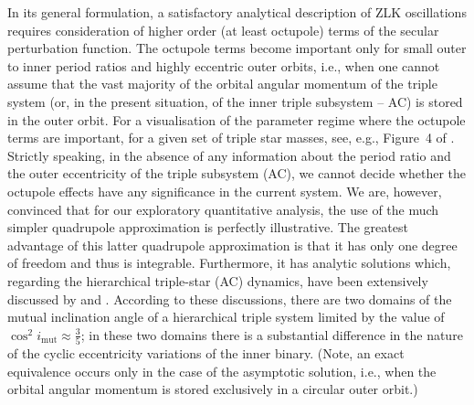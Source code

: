 \documentclass[fleqn,usenatbib]{mnras} %
\begin{document}
In its general formulation, a satisfactory analytical description of ZLK oscillations requires consideration of higher order (at least octupole) terms of the secular perturbation function. The octupole terms become important only for small outer to inner period ratios and highly eccentric outer orbits, i.e., when one cannot assume that the vast majority of the orbital angular momentum of the triple system (or, in the present situation, of the inner triple subsystem -- AC) is stored in the outer orbit. For a visualisation of the parameter regime where the octupole terms are important, for a given set of triple star masses, see, e.g., Figure~4 of \citet{Toonen2020}. Strictly speaking, in the absence of any information about the period ratio and the outer eccentricity of the triple subsystem (AC), we cannot decide whether the octupole effects have any significance in the current system. We are, however, convinced that for our exploratory quantitative analysis, the use of the much simpler quadrupole approximation is perfectly illustrative. The greatest advantage of this latter quadrupole approximation is that it has only one degree of freedom and thus is integrable. Furthermore, it has analytic solutions which, regarding the hierarchical triple-star (AC) dynamics, have been extensively discussed by \citet{Harrington1968} and \citet{Soderhjelm1982}. According to these discussions, there are two domains of the mutual inclination angle of a hierarchical triple system limited by the value of $\cos^2i_\mathrm{mut}\approx\frac{3}{5}$; in these two domains there is a substantial difference in the nature of the cyclic eccentricity variations of the inner binary. (Note, an exact equivalence occurs only in the case of the asymptotic solution, i.e., when the orbital angular momentum is stored exclusively in a circular outer orbit.)
\end{document}
